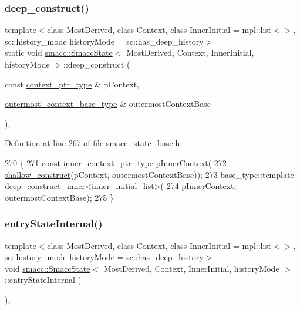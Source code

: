 \subsubsection{\texorpdfstring{deep\+\_\+construct()}{deep\_construct()}}
{\footnotesize\ttfamily template$<$class Most\+Derived, class Context, class Inner\+Initial = mpl\+::list$<$$>$, sc\+::history\+\_\+mode history\+Mode = sc\+::has\+\_\+deep\+\_\+history$>$ \\
static void \hyperlink{classsmacc_1_1SmaccState}{smacc\+::\+Smacc\+State}$<$ Most\+Derived, Context, Inner\+Initial, history\+Mode $>$\+::deep\+\_\+construct (\begin{DoxyParamCaption}\item[{const \hyperlink{classsmacc_1_1SmaccState_a0e15b77514301039f6bc093a9d3f6425}{context\+\_\+ptr\+\_\+type} \&}]{p\+Context,  }\item[{\hyperlink{classsmacc_1_1SmaccState_aaf76bbe2aa9dd73e3284605f84ab4b16}{outermost\+\_\+context\+\_\+base\+\_\+type} \&}]{outermost\+Context\+Base }\end{DoxyParamCaption})\hspace{0.3cm}{\ttfamily [inline]}, {\ttfamily [static]}}



Definition at line 267 of file smacc\+\_\+state\+\_\+base.\+h.


\begin{DoxyCode}
270   \{
271     \textcolor{keyword}{const} \hyperlink{classsmacc_1_1SmaccState_a65a772c2e2039e9a59148ba6ffb54d8a}{inner\_context\_ptr\_type} pInnerContext(
272         \hyperlink{classsmacc_1_1SmaccState_a1dccb401e1a99031863a21a590d953e6}{shallow\_construct}(pContext, outermostContextBase));
273     base\_type::template deep\_construct\_inner<inner\_initial\_list>(
274         pInnerContext, outermostContextBase);
275   \}
\end{DoxyCode}
\mbox{\label{classsmacc_1_1SmaccState_a084b95d0cb856d048fdb5ce81400eec7}} 
\subsubsection{\texorpdfstring{entry\+State\+Internal()}{entryStateInternal()}}
{\footnotesize\ttfamily template$<$class Most\+Derived, class Context, class Inner\+Initial = mpl\+::list$<$$>$, sc\+::history\+\_\+mode history\+Mode = sc\+::has\+\_\+deep\+\_\+history$>$ \\
void \hyperlink{classsmacc_1_1SmaccState}{smacc\+::\+Smacc\+State}$<$ Most\+Derived, Context, Inner\+Initial, history\+Mode $>$\+::entry\+State\+Internal (\begin{DoxyParamCaption}{ }\end{DoxyParamCaption})\hspace{0.3cm}{\ttfamily [inline]}, {\ttfamily [private]}}



